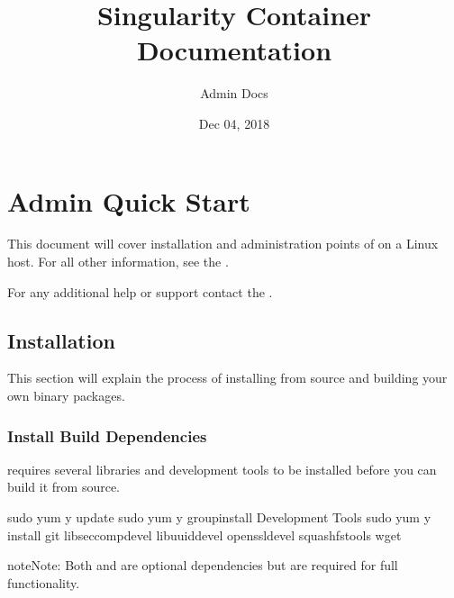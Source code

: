 \documentclass[letterpaper,10pt,english]{sphinxmanual}
\title{Singularity Container Documentation}
\date{Dec 04, 2018}
\author{Admin Docs}
\begin{document}
\maketitle
\sphinxtableofcontents
{}\label{\detokenize{index::doc}}



\chapter{Admin Quick Start}
\label{\detokenize{admin_quickstart:admin-quick-start}}\label{\detokenize{admin_quickstart::doc}}
This document will cover installation and administration points of
 on a Linux host. For all other information, see the
.

For any additional help or support contact the
.


\section{Installation}
\label{\detokenize{admin_quickstart:installation}}
This section will explain the process of installing  from
source and building your own binary packages.


\subsection{Install Build Dependencies}
\label{\detokenize{admin_quickstart:install-build-dependencies}}
 requires several libraries and development tools to be
installed before you can build it from source.

%
\begin{sphinxVerbatim}[commandchars=\\\{\}]
\PYGZdl{} sudo yum \PYGZhy{}y update
\PYGZdl{} sudo yum \PYGZhy{}y groupinstall \PYGZdq{}Development Tools\PYGZdq{}
\PYGZdl{} sudo yum \PYGZhy{}y install git libseccomp\PYGZhy{}devel libuuid\PYGZhy{}devel openssl\PYGZhy{}devel squashfs\PYGZhy{}tools wget
\end{sphinxVerbatim}

\begin{sphinxadmonition}{note}{Note:}
Both  and  are optional
dependencies but are required for full functionality.
\end{sphinxadmonition}
\end{document}
